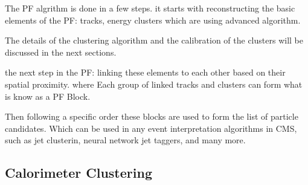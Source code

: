 The PF algrithm is done in a few steps.
it starts with reconstructing the basic elements of the PF: tracks, energy clusters which are using advanced algorithm.

The details of the clustering algorithm and the calibration of the clusters will be discussed in the next sections.  

the next step in the PF: linking these elements to each other based on their spatial proximity.
where Each group of linked tracks and clusters can form what is know as a PF Block.

Then following a specific order these blocks are used to form the list of particle candidates.
Which can be used in any event interpretation algorithms in CMS, such as jet clusterin, neural network jet taggers, and many more.




\subsection{Calorimeter Clustering}



